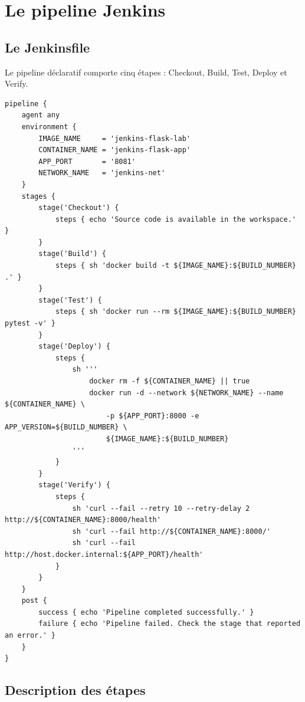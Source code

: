 \documentclass[11pt,a4paper]{article}
\begin{document}
\section{Le pipeline Jenkins}

\subsection{Le Jenkinsfile}

Le pipeline déclaratif comporte cinq étapes : Checkout, Build, Test, Deploy et Verify.

\begin{lstlisting}[caption={Jenkinsfile (version Linux utilisée par Jenkins).}]
pipeline {
    agent any
    environment {
        IMAGE_NAME     = 'jenkins-flask-lab'
        CONTAINER_NAME = 'jenkins-flask-app'
        APP_PORT       = '8081'
        NETWORK_NAME   = 'jenkins-net'
    }
    stages {
        stage('Checkout') {
            steps { echo 'Source code is available in the workspace.' }
        }
        stage('Build') {
            steps { sh 'docker build -t ${IMAGE_NAME}:${BUILD_NUMBER} .' }
        }
        stage('Test') {
            steps { sh 'docker run --rm ${IMAGE_NAME}:${BUILD_NUMBER} pytest -v' }
        }
        stage('Deploy') {
            steps {
                sh '''
                    docker rm -f ${CONTAINER_NAME} || true
                    docker run -d --network ${NETWORK_NAME} --name ${CONTAINER_NAME} \
                        -p ${APP_PORT}:8000 -e APP_VERSION=${BUILD_NUMBER} \
                        ${IMAGE_NAME}:${BUILD_NUMBER}
                '''
            }
        }
        stage('Verify') {
            steps {
                sh 'curl --fail --retry 10 --retry-delay 2 http://${CONTAINER_NAME}:8000/health'
                sh 'curl --fail http://${CONTAINER_NAME}:8000/'
                sh 'curl --fail http://host.docker.internal:${APP_PORT}/health'
            }
        }
    }
    post {
        success { echo 'Pipeline completed successfully.' }
        failure { echo 'Pipeline failed. Check the stage that reported an error.' }
    }
}
\end{lstlisting}

\subsection{Description des étapes}
\end{document}
